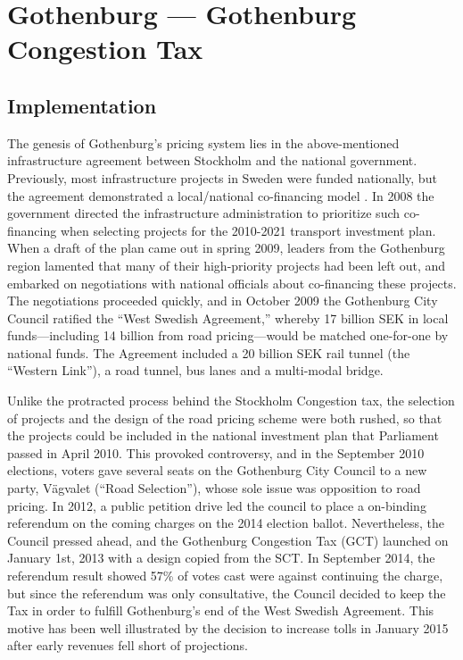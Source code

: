 \section{Gothenburg --- Gothenburg Congestion Tax}\label{sec:gothenburg}

\subsection{Implementation}

The genesis of Gothenburg's pricing system lies in the above-mentioned infrastructure agreement between Stockholm and the national government. Previously, most infrastructure projects in Sweden were funded nationally, but the agreement demonstrated a local/national co-financing model \citep{Borjesson2015,Hysing2015b}. In 2008 the government directed the infrastructure administration to prioritize such co-financing when selecting projects for the 2010-2021 transport investment plan. When a draft of the plan came out in spring 2009, leaders from the Gothenburg region lamented that many of their high-priority projects had been left out, and embarked on negotiations with national officials about co-financing these projects. The negotiations proceeded quickly, and in October 2009 the Gothenburg City Council ratified the ``West Swedish Agreement,'' whereby 17 billion SEK in local funds---including 14 billion from road pricing---would be matched one-for-one by national funds. The Agreement included a 20 billion SEK rail tunnel (the ``Western Link''), a road tunnel, bus lanes and a multi-modal bridge. 

Unlike the protracted process behind the Stockholm Congestion tax, the selection of projects and the design of the road pricing scheme were both rushed, so that the projects could be included in the national investment plan that Parliament passed in April 2010. This provoked controversy, and in the September 2010 elections, voters gave several seats on the Gothenburg City Council to a new party, Vägvalet (``Road Selection''), whose sole issue was opposition to road pricing. In 2012, a public petition drive led the council to  place a on-binding referendum on the coming charges on the 2014 election ballot. Nevertheless, the Council pressed ahead, and the Gothenburg Congestion Tax (GCT) launched on January 1st, 2013 with a design copied from the SCT. In September 2014, the referendum result showed 57\% of votes cast were against continuing the charge, but since the referendum was only consultative, the Council decided to keep the Tax in order to fulfill Gothenburg's end of the West Swedish Agreement. This motive has been well illustrated by the decision to increase tolls in January 2015 after early revenues fell short of projections.


